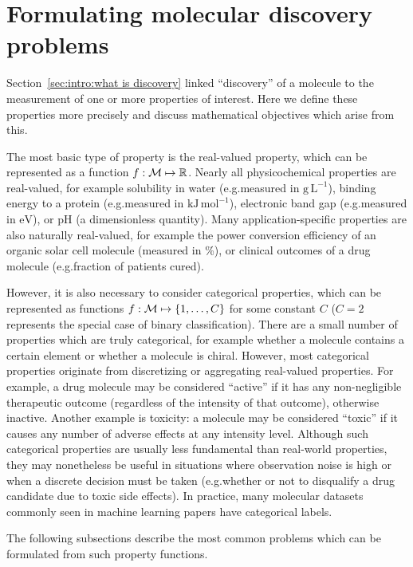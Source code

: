 \section{Formulating molecular discovery problems}
\label{sec:background:problems}

Section~\ref{sec:intro:what is discovery}
linked ``discovery'' of a molecule to the measurement of one or more properties of interest.
Here we define these properties more precisely and discuss mathematical objectives which arise from this.

The most basic type of property is the real-valued property,
which can be represented as a function
$f:\mathcal{M}\mapsto\mathbb{R}$.
Nearly all physicochemical properties are real-valued, for example
solubility in water (e.g.\@ measured in $\mathrm{g\,L^{-1}}$),
binding energy to a protein (e.g.\@ measured in $\mathrm{kJ\,mol^{-1}}$),
electronic band gap (e.g.\@ measured in $\mathrm{eV}$),
or pH (a dimensionless quantity).
Many application-specific properties are also naturally real-valued,
for example the power conversion efficiency of an organic solar cell molecule (measured in \%),
or clinical outcomes of a drug molecule (e.g.\@ fraction of patients cured).

However, it is also necessary to consider categorical properties,
which can be represented as functions $f:\mathcal{M}\mapsto\{1,\ldots,C\}$ for some constant $C$
($C=2$ represents the special case of binary classification).
There are a small number of properties which are truly categorical,
for example whether a molecule contains a certain element
or whether a molecule is chiral.
However, most categorical properties originate from discretizing or aggregating real-valued properties.
For example, a drug molecule may be considered ``active'' if it has any non-negligible therapeutic outcome
(regardless of the intensity of that outcome),
otherwise inactive.
Another example is toxicity: a molecule may be considered ``toxic'' if it causes any number of adverse effects
at any intensity level.
Although such categorical properties are usually less fundamental than real-world properties,
they may nonetheless be useful in situations where observation noise is high
or when a discrete decision must be taken (e.g.\@ whether or not to disqualify a drug candidate due to toxic side effects).
In practice, many molecular datasets commonly seen in machine learning papers have categorical labels.

The following subsections describe the most common problems which
can be formulated from such property functions.

